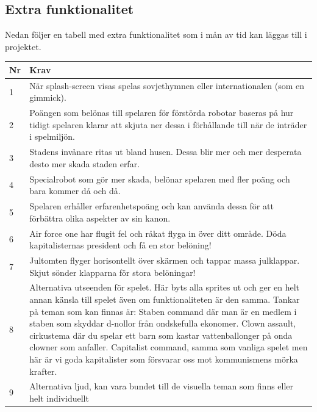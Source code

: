 \documentclass{TDP003mall}
\begin{document}
\subsection{Extra funktionalitet}
Nedan följer en tabell med extra funktionalitet som i mån av tid kan läggas till i projektet.
\begin{table}[!h]
\begin{tabularx}{\linewidth}{|l|X|}
\hline
Nr & Krav\\\hline
1 & När splash-screen visas spelas sovjethymnen eller internationalen (som en gimmick). \\\hline
2 & Poängen som belönas till spelaren för förstörda robotar baseras på hur tidigt spelaren klarar att skjuta ner dessa i förhållande till när de inträder i spelmiljön. \\\hline
3 & Stadens invånare ritas ut bland husen. Dessa blir mer och mer desperata desto mer skada staden erfar.\\\hline
4 & Specialrobot som gör mer skada, belönar spelaren med fler poäng och bara kommer då och då.\\\hline
5 & Spelaren erhåller erfarenhetspoäng och kan använda dessa för att förbättra olika aspekter av sin kanon.\\\hline
6 & Air force one har flugit fel och råkat flyga in över ditt område. Döda kapitalisternas president och få en stor belöning!\\\hline
7 & Jultomten flyger horisontellt över skärmen och tappar massa julklappar. Skjut sönder klapparna för stora belöningar!\\\hline
8 & Alternativa utseenden för spelet. Här byts alla sprites ut och ger en helt annan känsla till spelet även om funktionaliteten är den samma. Tankar på teman som kan finnas är: 
\newline \newline
Staben command där man är en medlem i staben som skyddar d-nollor från ondskefulla ekonomer. 
\newline \newline
Clown assault, cirkustema där du spelar ett barn som kastar vattenballonger på onda clowner som anfaller.
\newline \newline
Capitalist command, samma som vanliga spelet men här är vi goda kapitalister som försvarar oss mot kommunismens mörka krafter. \\\hline
9 & Alternativa ljud, kan vara bundet till de visuella teman som finns eller helt individuellt\\\hline
\end{tabularx}
\end{table}
\end{document}
